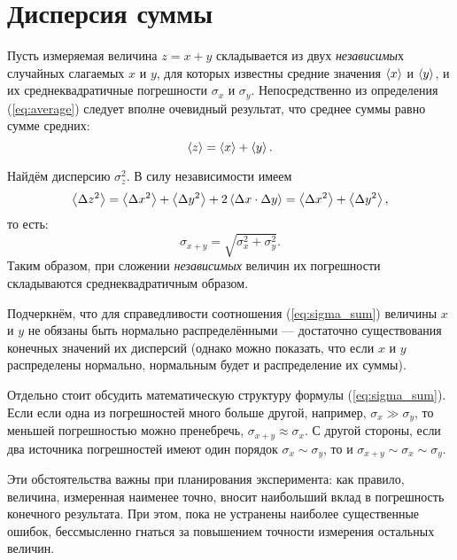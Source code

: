 \section{Дисперсия суммы}

Пусть измеряемая величина $z=x+y$ складывается из двух \emph{независимы}х
случайных слагаемых $x$ и $y$, для которых известны средние значения
$\left<x\right>$ и $\left<y\right>$, и их среднеквадратичные погрешности
$\sigma_{x}$ и $\sigma_{y}$. Непосредственно из определения (\ref{eq:average})
следует вполне очевидный результат, что среднее суммы равно сумме
средних: 
\[
\left<z\right>=\left<x\right>+\left<y\right>.
\]

Найдём дисперсию $\sigma_{z}^{2}$. В силу независимости имеем
\[
\left<\Delta z^{2}\right>=\left<\Delta x^{2}\right>+\left<\Delta y^{2}\right>+2\left<\Delta x\cdot\Delta y\right>=\left<\Delta x^{2}\right>+\left<\Delta y^{2}\right>,
\]
то есть:
\begin{equation}
\boxed{{\sigma_{x+y}=\sqrt{\sigma_{x}^{2}+\sigma_{y}^{2}}}}.\label{eq:sigma_sum}
\end{equation}
Таким образом, при сложении \emph{независимых }величин их погрешности
складываются среднеквадратичным образом.

Подчеркнём, что для справедливости соотношения (\ref{eq:sigma_sum})
величины $x$ и $y$ не обязаны быть нормально распределёнными ---
достаточно существования конечных значений их дисперсий (однако можно
показать, что если $x$ и $y$ распределены нормально, нормальным
будет и распределение их суммы).


Отдельно стоит обсудить математическую структуру формулы (\ref{eq:sigma_sum}).
Если если одна из погрешностей много больше другой, например, $\sigma_{x}\gg\sigma_{y}$,
то меньшей погрешностью можно пренебречь, $\sigma_{x+y}\approx\sigma_{x}$.
С другой стороны, если два источника погрешностей имеют один порядок
$\sigma_{x}\sim\sigma_{y}$, то и $\sigma_{x+y}\sim\sigma_{x}\sim\sigma_{y}$. 

Эти обстоятельства важны при планирования эксперимента: как правило,
величина, измеренная наименее точно, вносит наибольший вклад в погрешность
конечного результата. При этом, пока не устранены наиболее существенные
ошибок, бессмысленно гнаться за повышением точности измерения остальных
величин.

